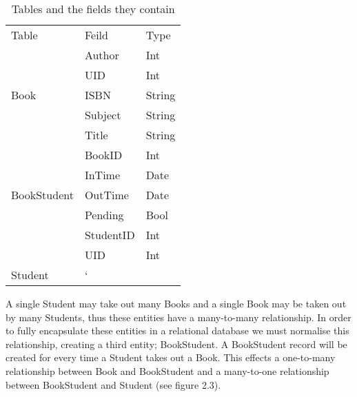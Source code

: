 \documentclass[draft]{book}
\begin{document}
\begin{table}

    \begin{tabular}{lll}

        Table & Feild & Type \\

        \multirow{5}{*}{Book}        & Author & Int \\
                                     & UID     & Int \\
                                     & ISBN    & String \\
                                     & Subject & String \\
                                     & Title   & String \\

        \multirow{5}{*}{BookStudent} & BookID & Int \\
                                     & InTime & Date \\
                                     & OutTime & Date \\
                                     & Pending & Bool \\
                                     & StudentID & Int \\
                                     & UID & Int \\

        \multirow{2}{*}{Student}     & `

    \end{tabular}

    \caption[Data Dictionary]{Tables and the fields they contain}

\end{table}

A single Student may take out many Books and a single Book may be taken out by many Students, thus these entities have a many-to-many relationship. In order to fully encapsulate these entities in a relational database we must normalise this relationship, creating a third entity; BookStudent. A BookStudent record will be created for every time a Student takes out a Book. This effects a one-to-many relationship between Book and BookStudent and a many-to-one relationship between BookStudent and Student (see figure 2.3).
\end{document}
